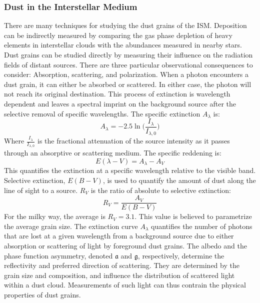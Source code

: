 \documentclass[10pt]{article}
\theoremstyle{definition}
\begin{document}
\subsubsection*{Dust in the Interstellar Medium}
There are many techniques for studying the dust grains of the ISM. Deposition can be indirectly measured by comparing the gas phase depletion of heavy elements in interstellar clouds with the abundances measured in nearby stars. Dust grains can be studied directly by measuring their influence on the radiation fields of distant sources. There are three particular observational consequences to consider: Absorption, scattering, and polarization. When a photon encounters a dust grain, it can either be absorbed or scattered. In either case, the photon will not reach its original destination. This process of extinction is wavelength dependent and leaves a spectral imprint on the background source after the selective removal of specific wavelengths. The specific extinction $A_{\lambda}$ is:
\begin{equation}
A_{\lambda} = -2.5\ln\big(\frac{I_{\lambda}}{I_{\lambda,0}}\big)
\end{equation}
Where $\frac{I_\lambda}{I_{\lambda,0}}$ is the fractional attenuation of the source intensity as it passes through an absorptive or scattering medium. The specific reddening is:
\begin{equation}
E(\lambda - V) = A_{\lambda} - A_{V}
\end{equation}
This quantifies the extinction at a specific wavelength relative to the visible band. Selective extinction, $E(B-V)$, is used to quantify the amount of dust along the line of sight to a source. $R_V$ is the ratio of absolute to selective extinction:
\begin{equation}
R_V = \frac{A_V}{E(B-V)}
\end{equation}
For the milky way, the average is $R_V = 3.1$. This value is believed to parametrize the average grain size. The extinction curve $A_{\lambda}$ quantifies the number of photons that are lost at a given wavelength from a background source due to either absorption or scattering of light by foreground dust grains. The albedo and the phase function asymmetry, denoted $\mathfrak{a}$ and $\mathfrak{g}$, respectively, determine the reflectivity and preferred direction of scattering. They are determined by the grain size and composition, and influence the distribution of scattered light within a dust cloud. Measurements of such light can thus contrain the physical properties of dust grains. 
\end{document}
